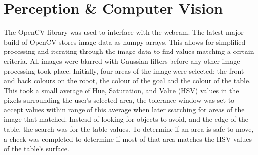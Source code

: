 \section{Perception \& Computer Vision}
\label{section::perception}

The OpenCV library was used to interface with the webcam. The latest major build of OpenCV stores image data as numpy arrays. This allows for simplified processing and iterating through the image data to find values matching a certain criteria. All images were blurred with Gaussian filters before any other image processing took place. Initially, four areas of the image were selected: the front and back colours on the robot, the colour of the goal and the colour of the table. This took a small average of Hue, Saturation, and Value (HSV) values in the pixels surrounding the user’s selected area, the tolerance window was set to accept values within range of this average when later searching for areas of the image that matched. Instead of looking for objects to avoid, and the edge of the table, the search was for the table values. To determine if an area is safe to move, a check was completed to determine if most of that area matches the HSV values of the table's surface. 